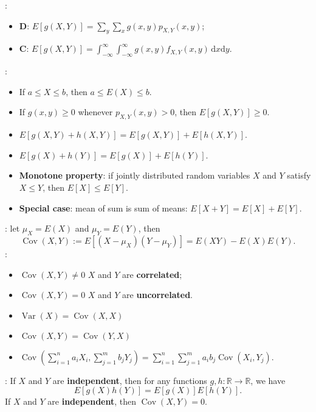 :
\begin{itemize}
  \item \textbf{D}: \(E[g(X, Y)] = \sum_y\sum_xg(x,y)p_{X,Y}(x,y)\);
  \item \textbf{C}: \(E[g(X, Y)] =
    \int_{-\infty}^{\infty}\int_{-\infty}^{\infty}g(x,y)f_{X,Y}(x,y)
  \,\mathrm{d}x\mathrm{d}y.\)
\end{itemize}

: 
\begin{itemize}
  \item If \(a \leq X \leq b\), then \(a \leq E(X) \leq b\).
  \item If \(g(x,y)\geq 0\) whenever \(p_{X,Y}(x,y) > 0\), then \(E[g(X, Y)]
    \geq 0\).
  \item \(E[g(X, Y) + h(X,Y)] = E[g(X, Y)] + E[h(X,Y)]\).
  \item \(E[g(X) + h(Y)] = E[g(X)] + E[h(Y)]\).
  \item \textbf{Monotone property}: if jointly distributed random variables
    \(X\) and \(Y\) satisfy \(X \leq Y\), then \(E[X] \leq E[Y]\).
  \item \textbf{Special case}: mean of sum is sum of means: \(E[X + Y] = E[X]
    + E[Y]\).
\end{itemize}


: let \(\mu_X = E(X)\) and \(\mu_Y = E(Y)\), then
{\small
\[\operatorname{Cov}\left(X,Y\right):= E[(X-\mu_X)(Y-\mu_Y)] = E(XY) -
E(X)E(Y).\]}
:
\begin{itemize}
  \item \(\operatorname{Cov}\left(X,Y\right)\neq 0\) \tf \(X\) and \(Y\)
    are \textbf{correlated};
  \item \(\operatorname{Cov}\left(X,Y\right)= 0\) \tf \(X\) and \(Y\) are
    \textbf{uncorrelated}.
  \item \(\operatorname{Var}\left(X\right)=\operatorname{Cov}\left(X,X\right)\)
  \item \(\operatorname{Cov}\left(X,Y\right)=\operatorname{Cov}\left(Y,
    X\right)\)
  \item \(\operatorname{Cov}\left(\sum\limits_{i=1}^{n}a_iX_i,
    \sum\limits_{j=1}^m b_jY_j\right) =
    \sum\limits_{i=1}^{n}\sum\limits_{j=1}^m a_ib_j\operatorname{Cov}\left(
    X_i,Y_j\right).\)
\end{itemize}

: If \(X\) and \(Y\) are \textbf{independent},
then for any functions \(g, h: \mathbb{R}\rightarrow \mathbb{R}\), we have 
\[E[g(X)h(Y)] = E[g(X)]E[h(Y)].\]
 If \(X\) and \(Y\) are
\textbf{independent}, then \(\operatorname{Cov}\left(X,Y\right)= 0\).


